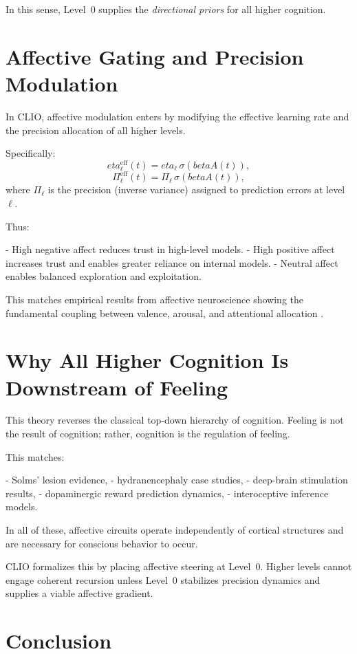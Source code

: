 \documentclass[12pt,oneside]{book}
\theoremstyle{plain}
\theoremstyle{definition}
\let\citep\parencite
\def\beta{beta}%
\def\eta{eta}%
\begin{document}
In this sense, Level~0 supplies the \emph{directional priors} for all
higher cognition.

\section{Affective Gating and Precision Modulation}

In CLIO, affective modulation enters by modifying the effective learning
rate and the precision allocation of all higher levels.

Specifically:
\[
\eta_{\ell}^{\mathrm{eff}}(t)
 = \eta_{\ell}\,\sigma(\beta A(t)),
\]
\[
\Pi_{\ell}^{\mathrm{eff}}(t)
 = \Pi_{\ell}\,\sigma(\beta A(t)),
\]
where $\Pi_{\ell}$ is the precision (inverse variance) assigned to
prediction errors at level $\ell$.

Thus:

- High negative affect reduces trust in high-level models.
- High positive affect increases trust and enables greater reliance on
  internal models.
- Neutral affect enables balanced exploration and exploitation.

This matches empirical results from affective neuroscience showing the
fundamental coupling between valence, arousal, and attentional
allocation \citep{li2019emotion,glimcher2011foundations}.

\section{Why All Higher Cognition Is Downstream of Feeling}

This theory reverses the classical top-down hierarchy of cognition.
Feeling is not the result of cognition; rather, cognition is the
regulation of feeling.

This matches:

- Solms’ lesion evidence,
- hydranencephaly case studies,
- deep-brain stimulation results,
- dopaminergic reward prediction dynamics,
- interoceptive inference models.

In all of these, affective circuits operate independently of cortical
structures and are necessary for conscious behavior to occur.

CLIO formalizes this by placing affective steering at Level~0.
Higher levels cannot engage coherent recursion unless Level~0 stabilizes
precision dynamics and supplies a viable affective gradient.

\section{Conclusion}
\end{document}
